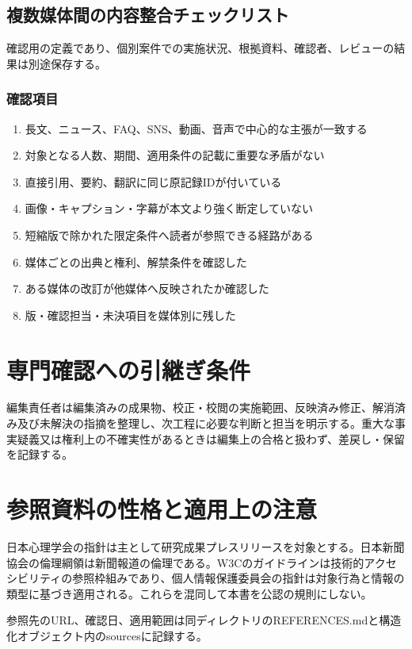 \documentclass[a4paper,11pt]{article}
\begin{document}
\subsection{複数媒体間の内容整合チェックリスト}
\par 確認用の定義であり、個別案件での実施状況、根拠資料、確認者、レビューの結果は別途保存する。\par\medskip
\subsubsection*{確認項目}
\begin{enumerate}[leftmargin=2em,itemsep=0.3em]
\item 長文、ニュース、FAQ、SNS、動画、音声で中心的な主張が一致する\par
\item 対象となる人数、期間、適用条件の記載に重要な矛盾がない\par
\item 直接引用、要約、翻訳に同じ原記録IDが付いている\par
\item 画像・キャプション・字幕が本文より強く断定していない\par
\item 短縮版で除かれた限定条件へ読者が参照できる経路がある\par
\item 媒体ごとの出典と権利、解禁条件を確認した\par
\item ある媒体の改訂が他媒体へ反映されたか確認した\par
\item 版・確認担当・未決項目を媒体別に残した\par
\end{enumerate}
\section{専門確認への引継ぎ条件}
\par 編集責任者は編集済みの成果物、校正・校閲の実施範囲、反映済み修正、解消済み及び未解決の指摘を整理し、次工程に必要な判断と担当を明示する。重大な事実疑義又は権利上の不確実性があるときは編集上の合格と扱わず、差戻し・保留を記録する。\par\medskip
\section{参照資料の性格と適用上の注意}
\par 日本心理学会の指針は主として研究成果プレスリリースを対象とする。日本新聞協会の倫理綱領は新聞報道の倫理である。W3Cのガイドラインは技術的アクセシビリティの参照枠組みであり、個人情報保護委員会の指針は対象行為と情報の類型に基づき適用される。これらを混同して本書を公認の規則にしない。\par\medskip
\par 参照先のURL、確認日、適用範囲は同ディレクトリのREFERENCES.mdと構造化オブジェクト内のsourcesに記録する。\par\medskip
\end{document}
